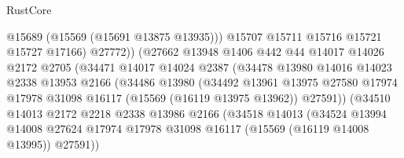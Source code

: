 \begin{lexlean}{RustCore}
\begin{coremodule}
                                    @15689
                                    (@15569 (@15691 @13875 @13935)))
                                  @15707
                                  @15711
                                  @15716
                                  @15721
                                  @15727
                                  @17166)
                                @27772))
                            (@27662
                              @13948
                              @1406
                              @442
                              @44
                              @14017
                              @14026
                              @2172
                              @2705
                              (@34471
                                @14017
                                @14024
                                @2387
                                (@34478
                                  @13980
                                  @14016
                                  @14023
                                  @2338
                                  @13953
                                  @2166
                                  (@34486
                                    @13980
                                    (@34492
                                      @13961
                                      @13975
                                      @27580
                                      @17974
                                      @17978
                                      @31098
                                      @16117
                                      (@15569 (@16119 @13975 @13962))
                                      @27591))
                                  (@34510
                                    @14013
                                    @2172
                                    @2218
                                    @2338
                                    @13986
                                    @2166
                                    (@34518
                                      @14013
                                      (@34524
                                        @13994
                                        @14008
                                        @27624
                                        @17974
                                        @17978
                                        @31098
                                        @16117
                                        (@15569 (@16119 @14008 @13995))
                                        @27591))

\end{coremodule}
\end{lexlean}
